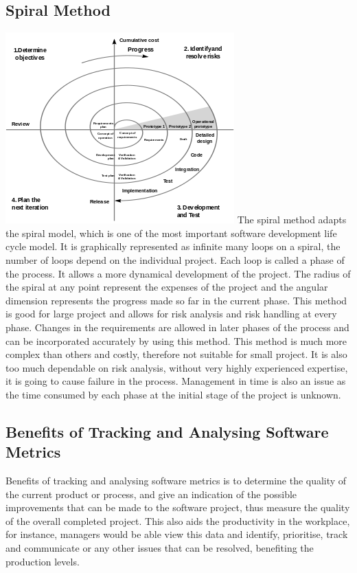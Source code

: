 \documentclass[a4paper]{article}
\begin{document}
{\subsection{Spiral Method}
\includegraphics[scale=0.9]{spiral.png}
\autocite{D03}
\bigbreak
The spiral method adapts the spiral model, which is one of the most important software development life cycle model. It is graphically represented as infinite many loops on a spiral, the number of loops depend on the individual project. Each loop is called a phase of the process. It allows a more dynamical development of the project. The radius of the spiral at any point represent the expenses of the project and the angular dimension represents the progress made so far in the current phase.
\bigbreak
This method is good for large project and allows for risk analysis and risk handling at every phase. Changes in the requirements are allowed in later phases of the process and can be incorporated accurately by using this method.
\bigbreak
This method is much more complex than others and costly, therefore not suitable for small project. It is also too much dependable on risk analysis, without very highly experienced expertise, it is going to cause failure in the process. Management in time is also an issue as the time consumed by each phase at the initial stage of the project is unknown.

\subsection{Benefits of Tracking and Analysing Software Metrics}
Benefits of tracking and analysing software metrics is to determine the quality of the current product or process, and give an indication of the possible improvements that can be made to the software project, thus measure the quality of the overall completed project. This also aids the productivity in the workplace, for instance, managers would be able view this data and identify, prioritise, track and communicate or any other issues that can be resolved, benefiting the production levels.

}
\end{document}
